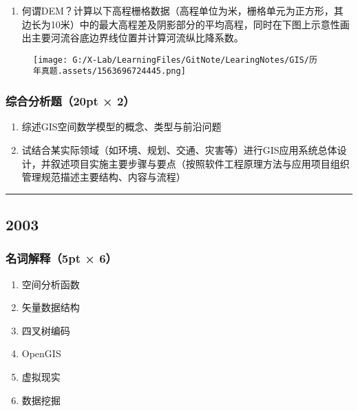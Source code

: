 \documentclass[]{article}
\begin{document}
\begin{enumerate}
\def\labelenumi{\arabic{enumi}.}
\item
  何谓DEM？计算以下高程栅格数据（高程单位为米，栅格单元为正方形，其边长为10米）中的最大高程差及阴影部分的平均高程，同时在下图上示意性画出主要河流谷底边界线位置并计算河流纵比降系数。
\end{enumerate}

\begin{figure}
\centering
\texttt{[image: G:/X-Lab/LearningFiles/GitNote/LearingNotes/GIS/历年真题.assets/1563696724445.png]}
\caption{}
\end{figure}

\hypertarget{header-n166}{%
\subsubsection{综合分析题（20pt × 2）}\label{header-n166}}

\begin{enumerate}
\def\labelenumi{\arabic{enumi}.}
\item
  综述GIS空间数学模型的概念、类型与前沿问题
\item
  试结合某实际领域（如环境、规划、交通、灾害等）进行GIS应用系统总体设计，并叙述项目实施主要步骤与要点（按照软件工程原理方法与应用项目组织管理规范描述主要结构、内容与流程）
\end{enumerate}

\begin{center}\rule{0.5\linewidth}{\linethickness}\end{center}

\hypertarget{header-n173}{%
\subsection{2003}\label{header-n173}}

\hypertarget{header-n174}{%
\subsubsection{名词解释（5pt × 6）}\label{header-n174}}

\begin{enumerate}
\def\labelenumi{\arabic{enumi}.}
\item
  空间分析函数
\item
  矢量数据结构
\item
  四叉树编码
\item
  OpenGIS
\item
  虚拟现实
\item
  数据挖掘
\end{enumerate}
\end{document}

